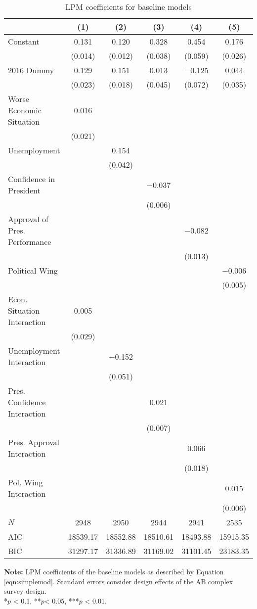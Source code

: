 \documentclass[12pt,a4]{article}
\begin{document}
\begin{table}[htbp]
\caption{LPM coefficients for baseline models}
\label{tab:lpmsimp}

\begin{tabular}[t]{lccccc}
\toprule
  & (1) & (2) & (3) & (4) & (5)\\
\midrule
Constant & \num{0.131} & \num{0.120} & \num{0.328} & \num{0.454} & \num{0.176}\\
 & (\num{0.014}) & (\num{0.012}) & (\num{0.038}) & (\num{0.059}) & (\num{0.026})\\
2016 Dummy & \num{0.129} & \num{0.151} & \num{0.013} & \num{-0.125} & \num{0.044}\\
 & (\num{0.023}) & (\num{0.018}) & (\num{0.045}) & (\num{0.072}) & (\num{0.035})\\
Worse Economic Situation & \num{0.016} &  &  &  & \\
 & (\num{0.021}) &  &  &  & \\
Unemployment &  & \num{0.154} &  &  & \\
 &  & (\num{0.042}) &  &  & \\
Confidence in President &  &  & \num{-0.037} &  & \\
 &  &  & (\num{0.006}) &  & \\
Approval of Pres. Performance &  &  &  & \num{-0.082} & \\
 &  &  &  & (\num{0.013}) & \\
Political Wing &  &  &  &  & \num{-0.006}\\
 &  &  &  &  & (\num{0.005})\\
Econ. Situation Interaction & \num{0.005} &  &  &  & \\
 & (\num{0.029}) &  &  &  & \\
Unemployment Interaction &  & \num{-0.152} &  &  & \\
 &  & (\num{0.051}) &  &  & \\
Pres. Confidence Interaction &  &  & \num{0.021} &  & \\
 &  &  & (\num{0.007}) &  & \\
Pres. Approval Interaction &  &  &  & \num{0.066} & \\
 &  &  &  & (\num{0.018}) & \\
Pol. Wing Interaction &  &  &  &  & \num{0.015}\\
 &  &  &  &  & (\num{0.006})\\
\midrule
$N$ & \num{2948} & \num{2950} & \num{2944} & \num{2941} & \num{2535}\\
AIC & \num{18539.17} & \num{18552.88} & \num{18510.61} & \num{18493.88} & \num{15915.35}\\
BIC & \num{31297.17} & \num{31336.89} & \num{31169.02} & \num{31101.45} & \num{23183.35}\\
\bottomrule
\end{tabular}


\vspace{0.25cm}
\textbf{Note:} LPM coefficients of the baseline models as described by Equation \ref{eqn:simplemod}. Standard errors consider design effects of the AB complex survey design.\\
*$p$ < 0.1, **$p$< 0.05, ***$p$ < 0.01.
\end{table}
\end{document}
